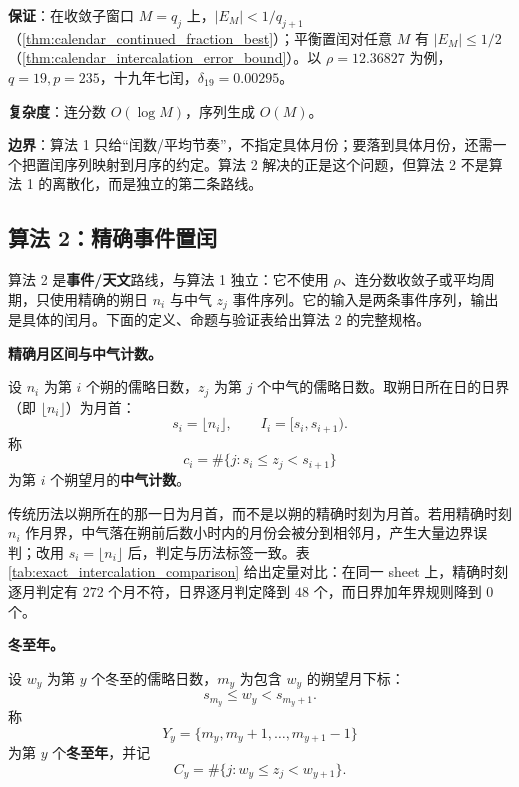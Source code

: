 \textbf{保证}：在收敛子窗口 \(M=q_j\) 上，\(|E_M|<1/q_{j+1}\)（\cref{thm:calendar_continued_fraction_best}）；平衡置闰对任意 \(M\) 有 \(|E_M|\le1/2\)（\cref{thm:calendar_intercalation_error_bound}）。以 \(\rho=12.36827\) 为例，\(q=19,p=235\)，十九年七闰，\(\delta_{19}=0.00295\)。

\textbf{复杂度}：连分数 \(O(\log M)\)，序列生成 \(O(M)\)。

\textbf{边界}：算法 1 只给“闰数/平均节奏”，不指定具体月份；要落到具体月份，还需一个把置闰序列映射到月序的约定。算法 2 解决的正是这个问题，但算法 2 不是算法 1 的离散化，而是独立的第二条路线。

\subsection{算法 2：精确事件置闰}
\label{subsec:exact_intercalation_algorithm}

算法 2 是\textbf{事件/天文}路线，与算法 1 独立：它不使用 \(\rho\)、连分数收敛子或平均周期，只使用精确的朔日 \(n_i\) 与中气 \(z_j\) 事件序列。它的输入是两条事件序列，输出是具体的闰月。下面的定义、命题与验证表给出算法 2 的完整规格。

\textbf{精确月区间与中气计数。}

\begin{definition}[精确月区间与中气计数]
\label{def:exact_month_term_count}
设 \(n_i\) 为第 \(i\) 个朔的儒略日数，\(z_j\) 为第 \(j\) 个中气的儒略日数。取朔日所在日的日界（即 \(\lfloor n_i\rfloor\)）为月首：
\[
s_i=\lfloor n_i\rfloor,\qquad I_i=[s_i,s_{i+1}).
\]
称
\[
c_i=\#\{j: s_i\le z_j<s_{i+1}\}
\]
为第 \(i\) 个朔望月的\textbf{中气计数}。
\end{definition}

\begin{remark}[日界约定]
\label{rem:exact_day_boundary}
传统历法以朔所在的那一日为月首，而不是以朔的精确时刻为月首。若用精确时刻 \(n_i\) 作月界，中气落在朔前后数小时内的月份会被分到相邻月，产生大量边界误判；改用 \(s_i=\lfloor n_i\rfloor\) 后，判定与历法标签一致。表 \ref{tab:exact_intercalation_comparison} 给出定量对比：在同一 sheet 上，精确时刻逐月判定有 \(272\) 个月不符，日界逐月判定降到 \(48\) 个，而日界加年界规则降到 \(0\) 个。
\end{remark}

\textbf{冬至年。}

\begin{definition}[冬至年与中气计数]
\label{def:winter_solstice_year}
设 \(w_y\) 为第 \(y\) 个冬至的儒略日数，\(m_y\) 为包含 \(w_y\) 的朔望月下标：
\[
s_{m_y}\le w_y<s_{m_y+1}.
\]
称
\[
Y_y=\{m_y,m_y+1,\dots,m_{y+1}-1\}
\]
为第 \(y\) 个\textbf{冬至年}，并记
\[
C_y=\#\{j: w_y\le z_j<w_{y+1}\}.
\]
\end{definition}

